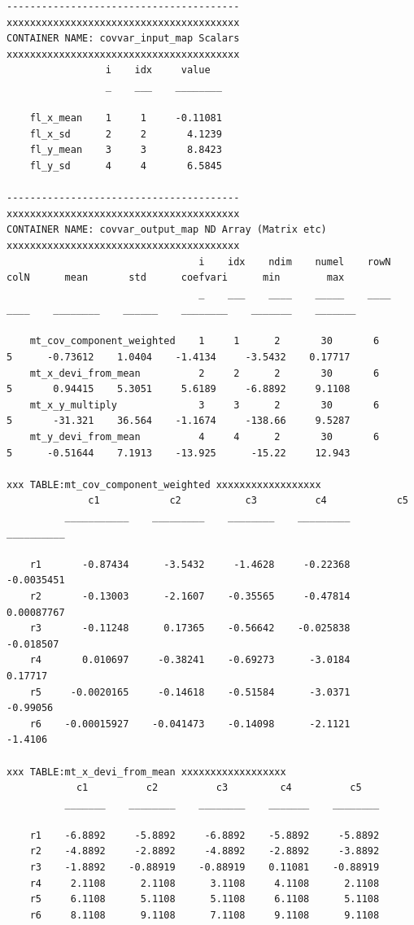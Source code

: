 \documentclass[
]{book}
\begin{document}
\begin{verbatim}
----------------------------------------
xxxxxxxxxxxxxxxxxxxxxxxxxxxxxxxxxxxxxxxx
CONTAINER NAME: covvar_input_map Scalars
xxxxxxxxxxxxxxxxxxxxxxxxxxxxxxxxxxxxxxxx
                 i    idx     value  
                 _    ___    ________

    fl_x_mean    1     1     -0.11081
    fl_x_sd      2     2       4.1239
    fl_y_mean    3     3       8.8423
    fl_y_sd      4     4       6.5845

----------------------------------------
xxxxxxxxxxxxxxxxxxxxxxxxxxxxxxxxxxxxxxxx
CONTAINER NAME: covvar_output_map ND Array (Matrix etc)
xxxxxxxxxxxxxxxxxxxxxxxxxxxxxxxxxxxxxxxx
                                 i    idx    ndim    numel    rowN    colN      mean       std      coefvari      min        max  
                                 _    ___    ____    _____    ____    ____    ________    ______    ________    _______    _______

    mt_cov_component_weighted    1     1      2       30       6       5      -0.73612    1.0404    -1.4134     -3.5432    0.17717
    mt_x_devi_from_mean          2     2      2       30       6       5       0.94415    5.3051     5.6189     -6.8892     9.1108
    mt_x_y_multiply              3     3      2       30       6       5       -31.321    36.564    -1.1674     -138.66     9.5287
    mt_y_devi_from_mean          4     4      2       30       6       5      -0.51644    7.1913    -13.925      -15.22     12.943

xxx TABLE:mt_cov_component_weighted xxxxxxxxxxxxxxxxxx
              c1            c2           c3          c4            c5    
          ___________    _________    ________    _________    __________

    r1       -0.87434      -3.5432     -1.4628     -0.22368    -0.0035451
    r2       -0.13003      -2.1607    -0.35565     -0.47814    0.00087767
    r3       -0.11248      0.17365    -0.56642    -0.025838     -0.018507
    r4       0.010697     -0.38241    -0.69273      -3.0184       0.17717
    r5     -0.0020165     -0.14618    -0.51584      -3.0371      -0.99056
    r6    -0.00015927    -0.041473    -0.14098      -2.1121       -1.4106

xxx TABLE:mt_x_devi_from_mean xxxxxxxxxxxxxxxxxx
            c1          c2          c3         c4          c5   
          _______    ________    ________    _______    ________

    r1    -6.8892     -5.8892     -6.8892    -5.8892     -5.8892
    r2    -4.8892     -2.8892     -4.8892    -2.8892     -3.8892
    r3    -1.8892    -0.88919    -0.88919    0.11081    -0.88919
    r4     2.1108      2.1108      3.1108     4.1108      2.1108
    r5     6.1108      5.1108      5.1108     6.1108      5.1108
    r6     8.1108      9.1108      7.1108     9.1108      9.1108


\end{verbatim}
\end{document}
